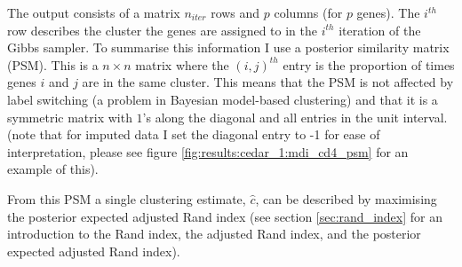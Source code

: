 \documentclass[12pt]{article} %
\begin{document}
	
	The output consists of a matrix $n_{iter}$ rows and $p$ columns (for $p$ genes). The $i^{th}$ row describes the cluster the genes are assigned to in the $i^{th}$ iteration of the Gibbs sampler. To summarise this information I use a posterior similarity matrix (PSM). This is a $n \times n$ matrix where the $(i,j)^{th}$ entry is the proportion of times genes $i$ and $j$ are in the same cluster. This means that the PSM is not affected by label switching (a problem in Bayesian model-based clustering) and that it is a symmetric matrix with $1$'s along the diagonal and all entries in the unit interval. (note that for imputed data I set the diagonal entry to -1 for ease of interpretation, please see figure \ref{fig:results:cedar_1:mdi_cd4_psm} for an example of this).
	
	From this PSM a single clustering estimate, $\hat{c}$, can be described by maximising the posterior expected adjusted Rand index \citep{FritschImprovedcriteriaclustering2009} (see section \ref{sec:rand_index} for an introduction to the Rand index, the adjusted Rand index, and the posterior expected adjusted Rand index).
	
	
\end{document}

